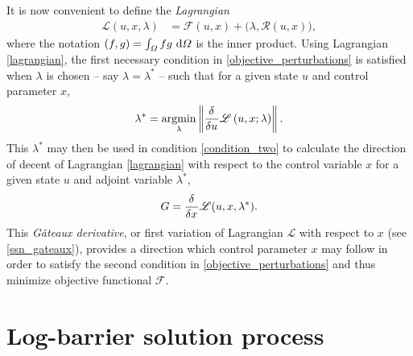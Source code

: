 It is now convenient to define the  \emph{Lagrangian}
\begin{align}
  \label{lagrangian}
  \mathscr{L}(u, x, \lambda) &= \mathscr{F}(u, x) + \big( \lambda, \mathscr{R}(u, x) \big),
\end{align}
where the notation $(f,g) = \int_{\varOmega} f g \ \mathrm{d}\varOmega$ is the inner product.  Using Lagrangian \cref{lagrangian}, the first necessary condition in \cref{objective_perturbations} is satisfied when $\lambda$ is chosen -- say $\lambda = \lambda^*$ -- such that for a given state $u$ and control parameter $x$, 
\begin{align}
  \label{adjoint}
  \lambda^* = \operatorname*{argmin}\limits_{\lambda} \left\Vert \frac{\delta{^{}} }{\delta u{^{}} } \mathscr{L} \left( u, x; \lambda \right) \right\Vert.
\end{align}
This $\lambda^*$ may then be used in condition \cref{condition_two} to calculate the direction of decent of Lagrangian \cref{lagrangian} with respect to the control variable $x$ for a given state $u$ and adjoint variable $\lambda^*$,
\begin{align}
  G = \frac{\delta{^{}} }{\delta x{^{}} } \mathscr{L} (u, x, \lambda^*).
\end{align}
This \emph{G\^{a}teaux derivative}, or first variation of Lagrangian $\mathscr{L}$ with respect to $x$ (see \cref{ssn_gateaux}), provides a direction which control parameter $x$ may follow in order to satisfy the second condition in \cref{objective_perturbations} and thus minimize objective functional $\mathscr{F}$.


\section{Log-barrier solution process} \label{ssn_log_barrier}

